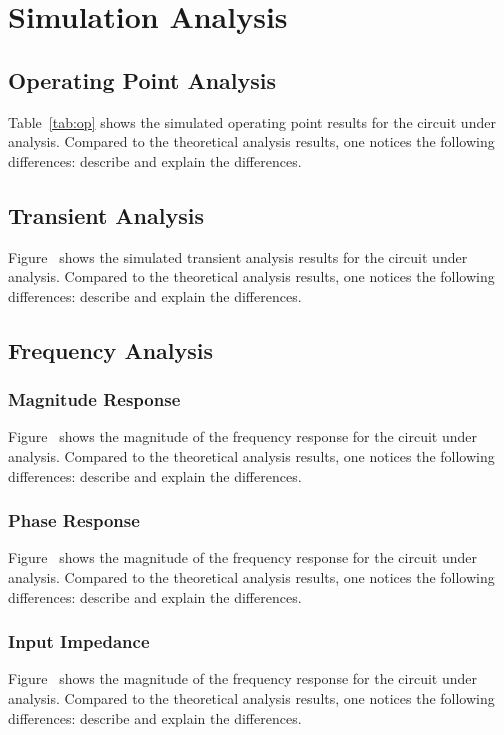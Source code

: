 \section{Simulation Analysis}
\label{sec:simulation}

\subsection{Operating Point Analysis}

Table~\ref{tab:op} shows the simulated operating point results for the circuit
under analysis. Compared to the theoretical analysis results, one notices the
following differences: describe and explain the differences.


\subsection{Transient Analysis}

Figure~ shows the simulated transient analysis results for the
circuit under analysis. Compared to the theoretical analysis results, one
notices the following differences: describe and explain the differences.





\subsection{Frequency Analysis}

\subsubsection{Magnitude Response}

Figure~ shows the magnitude of the frequency response for the
circuit under analysis. Compared to the theoretical analysis results, one
notices the following differences: describe and explain the differences.


\subsubsection{Phase Response}

Figure~ shows the magnitude of the frequency response for the
circuit under analysis. Compared to the theoretical analysis results, one
notices the following differences: describe and explain the differences.


\subsubsection{Input Impedance}

Figure~ shows the magnitude of the frequency response for the
circuit under analysis. Compared to the theoretical analysis results, one
notices the following differences: describe and explain the differences.




